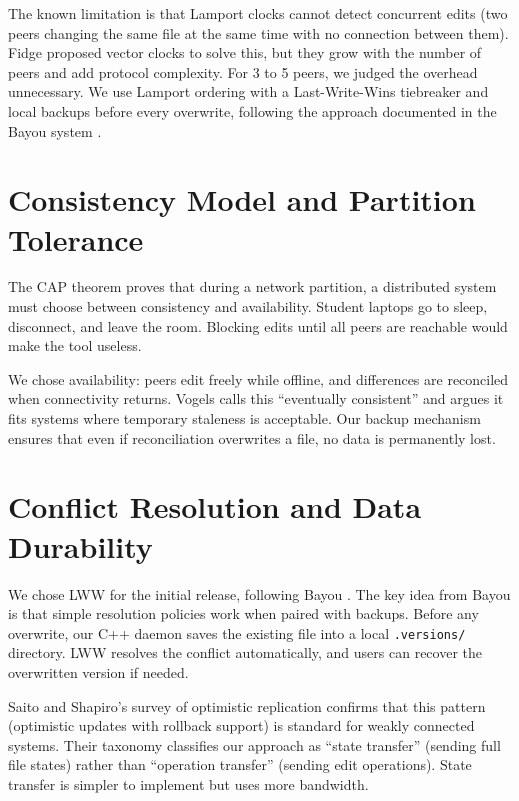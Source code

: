 The known limitation is that Lamport clocks cannot detect concurrent edits (two peers changing the same file at the same time with no connection between them). Fidge \citeyear{fidge1988} proposed vector clocks to solve this, but they grow with the number of peers and add protocol complexity. For 3 to 5 peers, we judged the overhead unnecessary. We use Lamport ordering with a Last-Write-Wins tiebreaker and local backups before every overwrite, following the approach documented in the Bayou system \cite{bayou1995}.

\section{Consistency Model and Partition Tolerance}

The CAP theorem \cite{brewer2002} proves that during a network partition, a distributed system must choose between consistency and availability. Student laptops go to sleep, disconnect, and leave the room. Blocking edits until all peers are reachable would make the tool useless.

We chose availability: peers edit freely while offline, and differences are reconciled when connectivity returns. Vogels \citeyear{vogels2009} calls this ``eventually consistent'' and argues it fits systems where temporary staleness is acceptable. Our backup mechanism ensures that even if reconciliation overwrites a file, no data is permanently lost.

\section{Conflict Resolution and Data Durability}

We chose LWW for the initial release, following Bayou \cite{bayou1995}. The key idea from Bayou is that simple resolution policies work when paired with backups. Before any overwrite, our C++ daemon saves the existing file into a local \texttt{.versions/} directory. LWW resolves the conflict automatically, and users can recover the overwritten version if needed.

Saito and Shapiro's \citeyear{saito2005} survey of optimistic replication confirms that this pattern (optimistic updates with rollback support) is standard for weakly connected systems. Their taxonomy classifies our approach as ``state transfer'' (sending full file states) rather than ``operation transfer'' (sending edit operations). State transfer is simpler to implement but uses more bandwidth.

